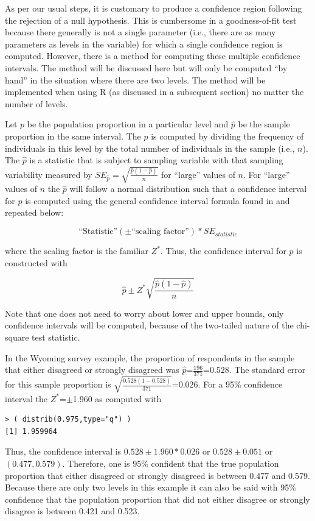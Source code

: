 \documentclass[10pt,openany]{book}\usepackage[]{graphicx}\usepackage[]{color}
\makeatletter
\newenvironment{kframe}{%
 \def\at@end@of@kframe{}%
 \ifinner\ifhmode%
  \def\at@end@of@kframe{\end{minipage}}%
  \begin{minipage}{\columnwidth}%
 \fi\fi%
 \def\FrameCommand##1{\hskip\@totalleftmargin \hskip-\fboxsep
 \colorbox{shadecolor}{##1}\hskip-\fboxsep
     \hskip-\linewidth \hskip-\@totalleftmargin \hskip\columnwidth}%
 \MakeFramed {\advance\hsize-\width
   \@totalleftmargin\z@ \linewidth\hsize
   \@setminipage}}%
 {\par\unskip\endMakeFramed%
 \at@end@of@kframe}
\newenvironment{knitrout}{}{} %
\makeatother
\begin{document}
As per our usual steps, it is customary to produce a confidence region following the rejection of a null hypothesis.  This is cumbersome in a goodness-of-fit test because there generally is not a single parameter (i.e., there are as many parameters as levels in the variable) for which a single confidence region is computed.  However, there is a method for computing these multiple confidence intervals.  The method will be discussed here but will only be computed ``by hand'' in the situation where there are two levels.  The method will be implemented when using R (as discussed in a subsequent section) no matter the number of levels.

Let $p$ be the population proportion in a particular level and $\hat{p}$ be the sample proportion in the same interval.  The $\hat{p}$ is computed by dividing the frequency of individuals in this level by the total number of individuals in the sample (i.e., $n$).  The $\hat{p}$ is a statistic that is subject to sampling variable with that sampling variability measured by $SE_{\hat{p}}=\sqrt{\frac{\hat{p}(1-\hat{p})}{n}}$ for ``large'' values of $n$.  For ``large'' values of $n$ the $\hat{p}$ will follow a normal distribution such that a confidence interval for $p$ is computed using the general confidence interval formula found in  and repeated below:

  \[ \text{``Statistic''} (\pm \text{``scaling factor''}) * SE_{statistic} \]

where the scaling factor is the familiar $Z^{*}$.  Thus, the confidence interval for $p$ is constructed with

  \[ \hat{p} \pm Z^{*}\sqrt{\frac{\hat{p}(1-\hat{p})}{n}} \]

Note that one does not need to worry about lower and upper bounds, only confidence intervals will be computed, because of the two-tailed nature of the chi-square test statistic.

In the Wyoming survey example, the proportion of respondents in the sample that either disagreed or strongly disagreed was $\hat{p}$=$\frac{196}{371}$=$0.528$.  The standard error for this sample proportion is $\sqrt{\frac{0.528(1-0.528)}{371}}$=$0.026$.  For a 95\% confidence interval the $Z^{*}$=$\pm$1.960 as computed with
\begin{knitrout}
\color{fgcolor}\begin{kframe}
\begin{verbatim}
> ( distrib(0.975,type="q") )
[1] 1.959964
\end{verbatim}
\end{kframe}
\end{knitrout}
Thus, the confidence interval is $0.528 \pm 1.960*0.026$ or $0.528 \pm 0.051$ or $(0.477,0.579)$.  Therefore, one is 95\% confident that the true population proportion that either disagreed or strongly disagreed is between 0.477 and 0.579.  Because there are only two levels in this example it can also be said with 95\% confidence that the population proportion that did not either disagree or strongly disagree is between 0.421 and 0.523.
\end{document}

